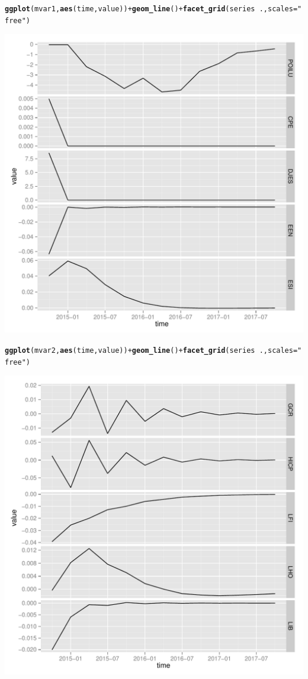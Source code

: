\documentclass[11pt,oneside, a4paper]{amsart}\usepackage[]{graphicx}\usepackage[]{color}
\makeatletter
\def\maxwidth{ %
  \ifdim\Gin@nat@width>\linewidth
    \linewidth
  \else
    \Gin@nat@width
  \fi
}
\newcommand{\hlstr}[1]{\textcolor[rgb]{0.192,0.494,0.8}{#1}}%
\newcommand{\hlopt}[1]{\textcolor[rgb]{0,0,0}{#1}}%
\newcommand{\hlstd}[1]{\textcolor[rgb]{0.345,0.345,0.345}{#1}}%
\newcommand{\hlkwc}[1]{\textcolor[rgb]{0.333,0.667,0.333}{#1}}%
\newcommand{\hlkwd}[1]{\textcolor[rgb]{0.737,0.353,0.396}{\textbf{#1}}}%
\newenvironment{kframe}{%
 \def\at@end@of@kframe{}%
 \ifinner\ifhmode%
  \def\at@end@of@kframe{\end{minipage}}%
  \begin{minipage}{\columnwidth}%
 \fi\fi%
 \def\FrameCommand##1{\hskip\@totalleftmargin \hskip-\fboxsep
 \colorbox{shadecolor}{##1}\hskip-\fboxsep
     \hskip-\linewidth \hskip-\@totalleftmargin \hskip\columnwidth}%
 \MakeFramed {\advance\hsize-\width
   \@totalleftmargin\z@ \linewidth\hsize
   \@setminipage}}%
 {\par\unskip\endMakeFramed%
 \at@end@of@kframe}
\newenvironment{knitrout}{}{} %
\makeatother
\begin{document}
\begin{knitrout}
\begin{kframe}
\begin{alltt}
\hlkwd{ggplot}\hlstd{(mvar1,} \hlkwd{aes}\hlstd{(time,value))} \hlopt{+} \hlkwd{geom_line}\hlstd{()} \hlopt{+} \hlkwd{facet_grid}\hlstd{(series} \hlopt{~} \hlstd{. ,}\hlkwc{scales}\hlstd{=}\hlstr{"free"}\hlstd{)}
\end{alltt}
\end{kframe}
\includegraphics[width=\maxwidth]{figure/unnamed-chunk-5-1} 
\begin{kframe}\begin{alltt}
\hlkwd{ggplot}\hlstd{(mvar2,} \hlkwd{aes}\hlstd{(time,value))} \hlopt{+} \hlkwd{geom_line}\hlstd{()} \hlopt{+} \hlkwd{facet_grid}\hlstd{(series} \hlopt{~} \hlstd{. ,}\hlkwc{scales}\hlstd{=}\hlstr{"free"}\hlstd{)}
\end{alltt}
\end{kframe}
\includegraphics[width=\maxwidth]{figure/unnamed-chunk-5-2} 

\end{knitrout}
\end{document}
